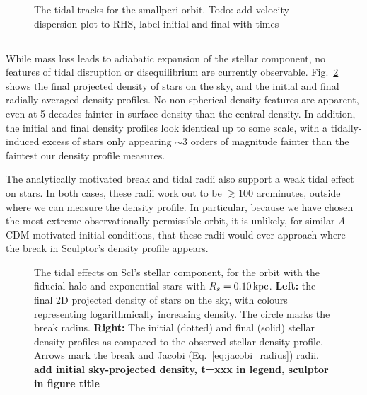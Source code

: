 \begin{figure}
\centering
{}
\caption[Sculptor Tidal Tracks]{The tidal tracks for the smallperi
orbit. Todo: add velocity dispersion plot to RHS, label initial and
final with times}\label{fig:scl_tidal_track}
\end{figure}

\subsection{}\label{section}

While mass loss leads to adiabatic expansion of the stellar component,
no features of tidal disruption or disequilibrium are currently
observable. Fig.~\ref{fig:scl_smallperi_i_f} shows the final projected
density of stars on the sky, and the initial and final radially averaged
density profiles. No non-spherical density features are apparent, even
at 5 decades fainter in surface density than the central density. In
addition, the initial and final density profiles look identical up to
some scale, with a tidally-induced excess of stars only appearing
\(\sim 3\) orders of magnitude fainter than the faintest our density
profile measures.

The analytically motivated break and tidal radii also support a weak
tidal effect on stars. In both cases, these radii work out to be
\(\gtrsim 100\) arcminutes, outside where we can measure the density
profile. In particular, because we have chosen the most extreme
observationally permissible orbit, it is unlikely, for similar
\(\Lambda\)CDM motivated initial conditions, that these radii would ever
approach where the break in Sculptor's density profile appears.

\begin{figure}
\centering
{}
\caption[Sculptor initial and final density profiles]{The tidal effects
on Scl's stellar component, for the \smallperi{} orbit with the fiducial
halo and exponential stars with \(R_s=0.10\,{\rm kpc}\). \textbf{Left:} the
final 2D projected density of stars on the sky, with colours
representing logarithmically increasing density. The circle marks the
break radius. \textbf{Right:} The initial (dotted) and final (solid)
stellar density profiles as compared to the observed stellar density
profile. Arrows mark the break and Jacobi (Eq.~\ref{eq:jacobi_radius})
radii. \textbf{add initial sky-projected density, t=xxx in legend,
sculptor in figure title}}\label{fig:scl_smallperi_i_f}
\end{figure}

